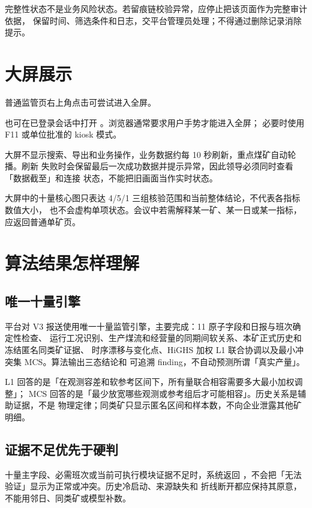 \documentclass[UTF8,openany,zihao=-4,fontset=none]{ctexbook}
\begin{document}
完整性状态不是业务风险状态。若留痕链校验异常，应停止把该页面作为完整审计依据，
保留时间、筛选条件和日志，交平台管理员处理；不得通过删除记录消除提示。

\chapter{大屏展示}

普通监管页右上角点击可尝试进入全屏。

也可在已登录会话中打开 。浏览器通常要求用户手势才能进入全屏；
必要时使用 F11 或单位批准的 kiosk 模式。

大屏不显示搜索、导出和业务操作，业务数据约每 10 秒刷新，重点煤矿自动轮播。刷新
失败时会保留最后一次成功数据并提示异常，因此领导必须同时查看「数据截至」和连接
状态，不能把旧画面当作实时状态。

大屏中的十量核心图只表达 4/5/1 三组核验范围和当前整体结论，不代表各指标数值大小，
也不会虚构单项状态。会议中若需解释某一矿、某一日或某一指标，应返回普通单矿页。

\chapter{算法结果怎样理解}

\section{唯一十量引擎}

平台对 V3 报送使用唯一十量监管引擎，主要完成：11 原子字段和日报与班次确定性检查、
运行工况识别、生产煤流和经营量的同期间软关系、本矿正式历史和冻结匿名同类矿证据、
时序漂移与变化点、HiGHS 加权 L1 联合协调以及最小冲突集 MCS。算法输出三态结论和
可追溯 finding，不自动预测所谓「真实产量」。

L1 回答的是「在观测容差和软参考区间下，所有量联合相容需要多大最小加权调整」；
MCS 回答的是「最少放宽哪些观测或参考组后才可能相容」。历史关系是辅助证据，不是
物理定律；同类矿只显示匿名区间和样本数，不向企业泄露其他矿明细。

\section{证据不足优先于硬判}

十量主字段、必需班次或当前可执行模块证据不足时，系统返回
，不会把「无法验证」显示为正常或冲突。历史冷启动、来源缺失和
折线断开都应保持其原意，不能用邻日、同类矿或模型补数。
\end{document}
